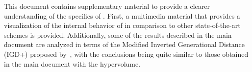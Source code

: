 This document contains supplementary material to provide a clearer understanding of the 
specifics of \VSDMOEA{}.
%
First, a multimedia material that provides a visualization of the internal behavior
of \VSDMOEA{} in comparison to other state-of-the-art schemes is provided.
%
Additionally, some of the results described in the main document are analyzed in terms
of the Modified Inverted Generational Distance (IGD+) proposed by~\cite{Joel:Inverted_Generational_Distance_Plus}, 
with the conclusions being quite similar to those obtained in the main document with
the hypervolume.
